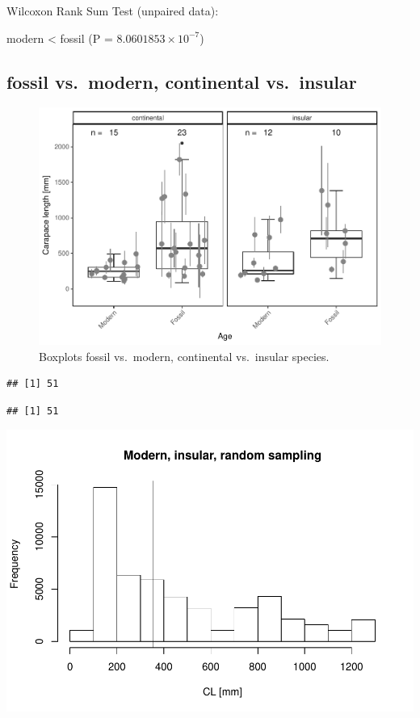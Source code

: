 \documentclass[]{article}
\begin{document}
Wilcoxon Rank Sum Test (unpaired data):

modern \textless{} fossil (P = \(8.0601853\times 10^{-7}\))

\newpage

\subsection{fossil vs.~modern, continental
vs.~insular}\label{fossil-vs.modern-continental-vs.insular}

\begin{figure}[htbp]
\centering
\includegraphics{MA_JJ_files/figure-latex/BPFMCI-1.pdf}
\caption{Boxplots fossil vs.~modern, continental vs.~insular species.}
\end{figure}

\begin{verbatim}
## [1] 51
\end{verbatim}

\begin{verbatim}
## [1] 51
\end{verbatim}

\includegraphics{MA_JJ_files/figure-latex/RSMFCI-1.pdf}
\end{document}
